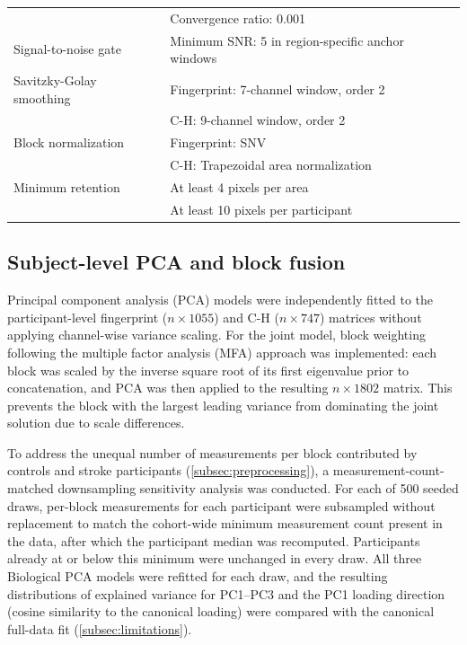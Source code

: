 \documentclass[preprint,12pt]{elsarticle}
\begin{document}
\begin{table}[ht]
\begin{tabularx}{\textwidth}{@{}>{\raggedright\arraybackslash}p{} >{\raggedright\arraybackslash}X@{}}
                          & Convergence ratio: 0.001 \\
\addlinespace
Signal-to-noise gate & Minimum SNR: 5 in region-specific anchor windows \\
\addlinespace
Savitzky-Golay smoothing & Fingerprint: 7-channel window, order 2 \\
                         & C-H: 9-channel window, order 2 \\
\addlinespace
Block normalization & Fingerprint: SNV \\
                    & C-H: Trapezoidal area normalization \\
\addlinespace
Minimum retention & At least 4 pixels per area \\
                  & At least 10 pixels per participant \\
\bottomrule
\end{tabularx}
\end{table}

\subsection{Subject-level PCA and block fusion} 
\label{subsec:biopca}

Principal component analysis (PCA) models were independently fitted to the participant-level fingerprint ($n\times1055$) and C-H ($n\times747$) matrices without applying channel-wise variance scaling. For the joint model, block weighting following the multiple factor analysis (MFA) approach was implemented: each block was scaled by the inverse square root of its first eigenvalue prior to concatenation, and PCA was then applied to the resulting $n\times1802$ matrix. This prevents the block with the largest leading variance from dominating the joint solution due to scale differences.

To address the unequal number of measurements per block contributed by controls and stroke participants (\cref{subsec:preprocessing}), a measurement-count-matched downsampling sensitivity analysis was conducted. For each of 500 seeded draws, per-block measurements for each participant were subsampled without replacement to match the cohort-wide minimum measurement count present in the data, after which the participant median was recomputed. Participants already at or below this minimum were unchanged in every draw. All three Biological PCA models were refitted for each draw, and the resulting distributions of explained variance for PC1–PC3 and the PC1 loading direction (cosine similarity to the canonical loading) were compared with the canonical full-data fit (\cref{subsec:limitations}).
\end{document}
